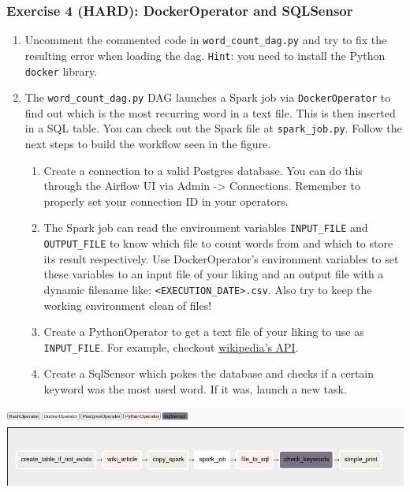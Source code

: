 \documentclass[leqno, 10pt, envcountsect]{beamer}
\numberwithin{equation}{section}
\theoremstyle{definition}
\theoremstyle{example}
\numberwithin{figure}{section}
\numberwithin{table}{section}
\let\olditem\item
\renewcommand{\item}{%
\olditem\vspace{1pt}}
\begin{document}
\begin{frame}[fragile=singleslide]
  \frametitle{Exercise 4 (HARD): DockerOperator and SQLSensor}
  \begin{enumerate}
    \item Uncomment the commented code in \texttt{word\_count_dag.py} and try to
      fix the resulting error when loading the dag. \texttt{Hint}: you need to
      install the Python \texttt{docker} library.
    \item The \texttt{word\_count_dag.py} DAG launches a Spark job via
      \texttt{DockerOperator} to find out which is the most recurring word in a
      text file. This is then inserted in a SQL table. You can check out the
      Spark file at \texttt{spark_job.py}.  Follow the next steps to build the
      workflow seen in the figure.
    \begin{enumerate}
      \item Create a connection to a valid Postgres database. You can do this
        through the Airflow UI via Admin -> Connections. Remember to properly
        set your connection ID in your operators.
      \item The Spark job can read the environment variables
        \texttt{INPUT\_FILE} and \texttt{OUTPUT\_FILE} to know which file to
        count words from and which to store its result respectively. Use
        DockerOperator's environment variables to set these variables to an
        input file of your liking and an output file with a dynamic filename
        like: \texttt{<EXECUTION\_DATE>.csv}. Also try to keep the working
        environment clean of files!
      \item Create a PythonOperator to get a text file of your liking to use as
        \texttt{INPUT\_FILE}. For example, checkout
        \href{https://wikipedia.readthedocs.io/en/latest/code.html}{wikipedia's
        API}.
      \item Create a SqlSensor which pokes the database and checks if a certain
        keyword was the most used word. If it was, launch a new task.
    \end{enumerate}
  \end{enumerate}
  \begin{center}
    \includegraphics[scale=0.2]{exercise_4.png}
  \end{center}
\end{frame}
\end{document}
